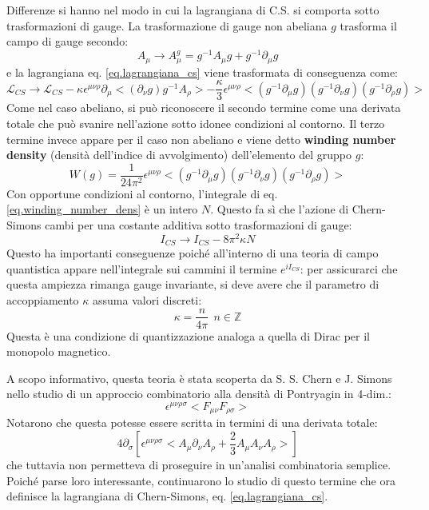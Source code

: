 Differenze si hanno nel modo in cui la lagrangiana di C.S. si comporta sotto trasformazioni di gauge. La trasformazione di gauge non abeliana $g$ trasforma il campo di gauge secondo:
\begin{equation}
    A_\mu \rightarrow A_\mu^g = g^{-1}A_\mu g + g^{-1}\partial_\mu g
    \label{eq.gauge_transform_cs}
\end{equation}
e la lagrangiana eq. \ref{eq.lagrangiana_cs} viene trasformata di conseguenza come:
\begin{equation}
    \mathcal L_{CS} \rightarrow \mathcal L_{CS} - \kappa \epsilon^{\mu\nu\rho}\partial_\mu < (\partial_\nu g)g^{-1}A_\rho > - \frac{\kappa}{3}\epsilon^{\mu\nu\rho}< (g^{-1}\partial_\mu g)(g^{-1}\partial_\nu g)(g^{-1}\partial_\rho g)>
    \label{eq.variazione_lagrangiana_cs_trasform_gauge}
\end{equation}
Come nel caso abeliano, si può riconoscere il secondo termine come una derivata totale che può svanire nell'azione sotto idonee condizioni al contorno. Il terzo termine invece appare per il caso non abeliano e viene detto \textbf{winding number density} (densità dell'indice di avvolgimento) dell'elemento del gruppo $g$:
\begin{equation}
    W(g) = \frac{1}{24\pi^2}\epsilon^{\mu\nu\rho}< (g^{-1}\partial_\mu g)(g^{-1}\partial_\nu g)(g^{-1}\partial_\rho g)>
    \label{eq.winding_number_dens}
\end{equation}
Con opportune condizioni al contorno, l'integrale di eq. \ref{eq.winding_number_dens} è un intero $N$. Questo fa sì che l'azione di Chern-Simons cambi per una costante additiva sotto trasformazioni di gauge:
\begin{equation}
    I_{CS} \rightarrow I_{CS} - 8\pi^2 \kappa N
    \label{eq.azione_cs_trasform_gauge}
\end{equation}
Questo ha importanti conseguenze poiché all'interno di una teoria di campo quantistica appare nell'integrale sui cammini il termine $e^{iI_{CS}}$: per assicurarci che questa ampiezza rimanga gauge invariante, si deve avere che  il parametro di accoppiamento $\kappa$ assuma valori discreti:
\begin{equation*}
    \kappa = \frac{n}{4\pi} \ \ n \in \mathbb Z
\end{equation*}
Questa è una condizione di quantizzazione analoga a quella di Dirac per il monopolo magnetico.

A scopo informativo, questa teoria è stata scoperta da S. S. Chern e J. Simons nello studio di un approccio combinatorio alla densità di Pontryagin in 4-dim.:
\begin{equation*}
    \epsilon^{\mu\nu\rho\sigma}<F_{\mu\nu}F_{\rho\sigma}>
\end{equation*}
Notarono che questa potesse essere scritta in termini di una derivata totale:
\begin{equation*}
    4\partial_\sigma \left[ \epsilon^{\mu\nu\rho\sigma}<A_\mu \partial_\nu A_\rho + \frac{2}{3}A_\mu A_\nu A_\rho >\right]
\end{equation*}
che tuttavia non permetteva di proseguire in un'analisi combinatoria semplice. Poiché parse loro interessante, continuarono lo studio di questo termine che ora definisce la lagrangiana di Chern-Simons, eq. \ref{eq.lagrangiana_cs}.

